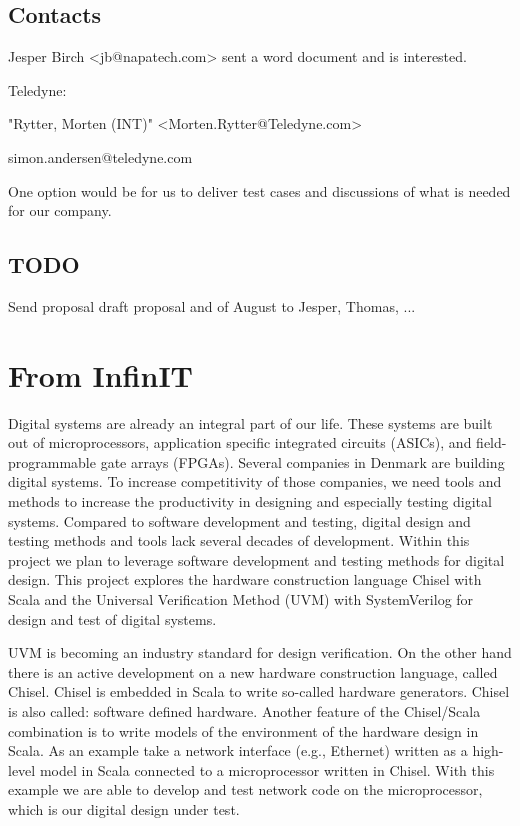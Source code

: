 \documentclass[fleqn,12pt]{article}
\begin{document}
\subsection{Contacts}

Jesper Birch <jb@napatech.com> sent a word document and is interested.

Teledyne:

"Rytter, Morten (INT)" <Morten.Rytter@Teledyne.com>

simon.andersen@teledyne.com



One option would be for us to deliver test cases and discussions of what is needed for our company. 



\subsection{TODO}

Send proposal draft proposal and of August to Jesper, Thomas, ...

\section{From InfinIT}

Digital systems are already an integral part of our life. These systems are built out of microprocessors, application specific integrated circuits (ASICs), and field-programmable gate arrays (FPGAs). Several companies in Denmark are building digital systems. To increase competitivity of those companies, we need tools and methods to increase the productivity in designing and especially testing digital systems. Compared to software development and testing, digital design and testing methods and tools lack several decades of development. Within this project we plan to leverage software development and testing methods for digital design. This project explores the hardware construction language Chisel with Scala and the Universal Verification Method (UVM) with SystemVerilog for design and test of digital systems.



UVM is becoming an industry standard for design verification. On the other hand there is an active development on a new hardware construction language, called Chisel. Chisel is embedded in Scala to write so-called hardware generators. Chisel is also called: software defined hardware. Another feature of the Chisel/Scala combination is to write models of the environment of the hardware design in Scala. As an example take a network interface (e.g., Ethernet) written as a high-level model in Scala connected to a microprocessor written in Chisel. With this example we are able to develop and test network code on the microprocessor, which is our digital design under test.
\end{document}
